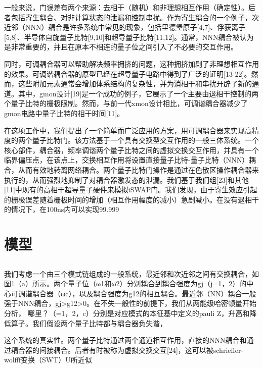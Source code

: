 \documentclass[11pt,twocolumn]{ctexart}
\begin{document}
一般来说，门误差有两个来源：去相干（随机）和非理想相互作用（确定性）。后者包括寄生耦合、对非计算状态的泄漏和控制串扰。作为寄生耦合的一个例子，次近邻（NNN）耦合是许多系统中常见的现象，包括里德堡原子[4,7]、俘获离子[5,8]、半导体自旋量子比特[9,10]和超导量子比特[11,12]。通常，NNN耦合被认为是非常重要的，并且在原本不相连的量子位之间引入了不必要的交互作用。

同时，可调耦合器可以帮助解决频率拥挤的问题，这种拥挤加剧了非理想相互作用的效果。可调谐耦合器的原型已经在超导量子电路中得到了广泛的证明[13-22]。然而，这些附加元素通常会增加体系结构的复杂性，并为消相干和串扰开辟了新的通道。其中，gmon设计[19]是一个成功的例子，它展示了一个主要由退相干控制的两个量子比特的栅极限制。然而，与前一代xmon设计相比，可调谐耦合器减少了gmon电路中量子比特的相干时间[11]。

在这项工作中，我们提出了一个简单而广泛应用的方案，用可调耦合器来实现高精度的两个量子比特门。该方法基于一个具有交换型交互作用的一般三体系统。一个核心部件，耦合器，频率调谐两个量子比特之间的虚拟交换交互作用，并具有一个临界偏压点，在该点上，交换相互作用将设置直接量子比特-量子比特（NNN）耦合，从而有效地转离网络耦合。两个量子比特门操作是通过在色散区操作耦合器来执行的，从而强烈地抑制了对耦合器激发态的泄漏。我们基于我们组[23]和其他[11]中现有的高相干超导量子硬件来模拟iSWAP门。我们发现，由于寄生效应引起的栅极误差随着栅极时间的增加（相互作用幅度的减小）急剧减小。在没有退相干的情况下，在100ns内可以实现99.999%


\section{模型}
\subsection{}
我们考虑一个由三个模式链组成的一般系统，最近邻和次近邻之间有交换耦合，如图1（a）所示。两个量子位（ω1和ω2）分别耦合到耦合强度为gj（j=1，2）的中心可调谐耦合器（ωc），以及耦合强度为g12的相互耦合。最近邻（NN）耦合一般强于NNN耦合，gj>g12>0。在不失一般性的前提下，我们从两能级哈密顿量开始分析，
哪里？（=1，2，c）分别是对应模式的本征基中定义的pauli Z，升高和降低算子。我们假设两个量子比特都与耦合器负失谐，

这个系统的真实性。两个量子比特通过两个通道相互作用，直接的NNN耦合和通过耦合器的间接耦合。后者有时被称为虚拟交换交互[24]，这可以被schrieffer-wolfff变换（SWT）U所近似
\end{document}
